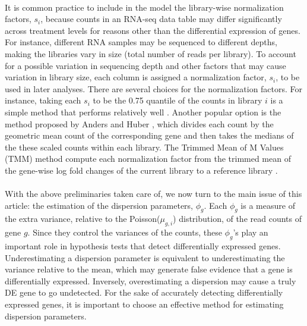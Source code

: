 \documentclass[10pt]{article}
\begin{document}
\paragraph{} \indent It is common practice to include in the model the library-wise normalization factors, $s_i$, because counts in an RNA-seq data table may differ significantly across treatment levels for reasons other than the differential expression of genes. For instance, different RNA samples may be sequenced to different depths, making the libraries vary in size (total number of reads per library). To account for a possible variation in sequencing depth and other factors that may cause variation in library size, each column is assigned a normalization factor, $s_i$, to be used in later analyses. There are several choices for the normalization factors. For instance, taking each $s_i$ to be the 0.75 quantile of the counts in library $i$ is a simple method that performs relatively well \cite{amap}. Another popular option is the method proposed by Anders and Huber \cite{deseq}, which divides each count by the geometric mean count of the corresponding gene and then takes the medians of the these scaled counts within each library. The Trimmed Mean of M Values (TMM) method compute each normalization factor from the trimmed mean of the gene-wise log fold changes of the current library to a reference library \cite{tmm}.




\paragraph{} \indent With the above preliminaries taken care of, we now turn to the main issue of this article: the estimation of the dispersion parameters, $\phi_{g}$. Each $\phi_{g}$ is a measure of the extra variance, relative to the Poisson($\mu_{g,i}$) distribution, of the read counts of gene $g$. Since they control the variances of the counts, these $\phi_g$'s play an important role in hypothesis tests that detect differentially expressed genes. Underestimating a dispersion parameter is equivalent to underestimating the variance relative to the mean, which may generate false evidence that a gene is differentially expressed. Inversely, overestimating a dispersion may cause a truly DE gene to go undetected. For the sake of accurately detecting differentially expressed genes, it is important to choose an effective method for estimating dispersion parameters.
\end{document}
